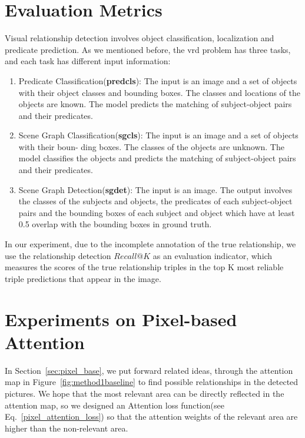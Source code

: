 \section{Evaluation Metrics}


Visual relationship detection involves object classification, localization and predicate prediction. As we mentioned before, the vrd problem has three tasks, and each task has different input information:

\begin{enumerate}[\qquad  $\bullet$]
\item Predicate Classification(\textbf{predcls}): The input is an image and a set of objects with their object classes and bounding boxes. The classes and locations of the objects are known. The model predicts the matching of subject-object pairs and their predicates.

\item Scene Graph Classification(\textbf{sgcls}): The input is an image and a set of objects with their boun- ding boxes. The classes of the objects are unknown. The model classifies the objects and predicts the matching of subject-object pairs and their predicates.

\item Scene Graph Detection(\textbf{sgdet}): The input is an image. The output involves the classes of the subjects and objects, the predicates of each subject-object pairs and the bounding boxes of each subject and object which have at least 0.5 overlap with the bounding boxes in ground truth.
\end{enumerate}

In our experiment, due to the incomplete annotation of the true relationship, we use the relationship detection $ Recall@K $ as an evaluation indicator, which measures the scores of the true relationship triples in the top K most reliable triple predictions that appear in the image.


\section{Experiments on Pixel-based Attention}
In Section~\ref{sec:pixel_base}, we put forward related ideas, through the attention map in Figure~\ref{fig:method1baseline} to find possible relationships in the detected pictures. We hope that the most relevant area can be directly reflected in the attention map, so we designed an Attention loss function(see Eq.~\ref{pixel_attention_loss}) so that the attention weights of the relevant area are higher than the non-relevant area.


